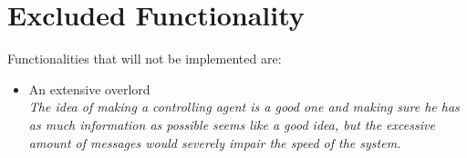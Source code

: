 \section{Excluded Functionality}
Functionalities that will not be implemented are:
\begin{itemize}
	\item An extensive overlord \\
		\textit{The idea of making a controlling agent is a good one and making sure he has as much information as possible seems like a good idea, but the excessive amount of messages would severely impair the speed of the system.}
\end{itemize}


